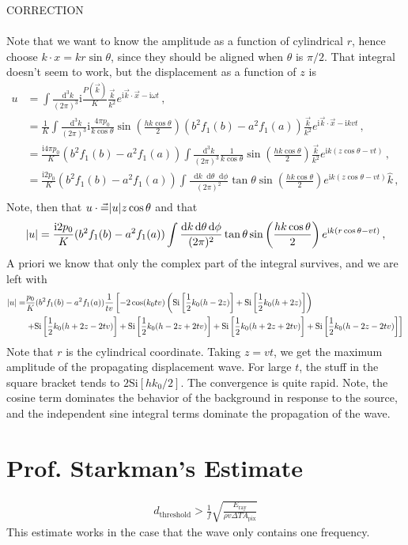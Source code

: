 \documentclass{article}
\newcommand*\diff{\mathop{}\!\mathrm{d}}
\newcommand*\te[1]{\text{#1}}
\newcommand*\p[1]{\left(#1\right)}
\newcommand*\ps[1]{\left[#1\right]}
\newcommand*\f[2]{\frac{#1}{#2}}
\newcommand*\I{\te{i}}
\begin{document}
CORRECTION
\\\\
Note that we want to know the amplitude as a function of cylindrical $r$, hence choose $k\cdot x = k r \sin\theta$, since they should be aligned when $\theta$ is $\pi/2$. That integral doesn't seem to work, but the displacement as a function of $z$ is
\begin{align}
u &= \int\f{\diff^3 k}{(2\pi)^3}\I\f{P(\vec k)}{K}\f{\vec k}{k^2}e^{\I \vec k\cdot\vec x - \I\omega t}\,,\\
&=\f{1}{K}\int\f{\diff^3 k}{(2\pi)^3}\I\f{4\pi p_0}{k\cos\theta}\sin\p{\f{h k\cos\theta}{2}}(b^2f_1(b)-a^2f_1(a))\f{\vec k}{k^2}e^{\I \vec k\cdot\vec x - \I k v t}\,,\\
&=\f{\I4\pi p_0}{K}(b^2f_1(b)-a^2f_1(a))\int\f{\diff^3 k}{(2\pi)^3}\f{1}{k\cos\theta}\sin\p{\f{h k\cos\theta}{2}}\f{\vec k}{k^2}e^{\I k(z\cos\theta -  v t)}\,,\\
&=\f{\I2 p_0}{K}(b^2f_1(b)-a^2f_1(a))\int\f{\diff k\diff\theta\diff\phi}{(2\pi)^2}\tan\theta\sin\p{\f{h k\cos\theta}{2}}e^{\I k(z\cos\theta -  v t)}\hat k\,,\\
\end{align}
Note, then that $u\cdot\vec  = \abs{u}z\cos\theta$ and that
\begin{align}
\abs{u}&=\f{\I2 p_0}{K}(b^2f_1(b)-a^2f_1(a))\int\f{\diff k\diff\theta\diff\phi}{(2\pi)^2}\tan\theta\sin\p{\f{h k\cos\theta}{2}}e^{\I k(r\cos\theta -  v t)}\,,\\
\end{align}
A priori we know that only the complex part of the integral survives, and we are left with
\begin{align}
\notag\abs{u} =& \f{ p_0}{K}(b^2f_1(b)-a^2f_1(a))\f{1}{tv}\ps{-2\cos(k_0 tv)\p{\te{Si}\ps{\f12 k_0(h - 2z)} + \te{Si}\ps{\f12 k_0(h + 2z)}}\right.\\&\left. + \te{Si} \ps{\f12 k_0(h+2z-2tv)}+ \te{Si}\ps{\f12 k_0(h-2z+2tv)}+\te{Si}\ps{\f12 k_0(h+2z+2tv)}+\te{Si}\ps{\f12 k_0(h-2z-2tv)}}
\end{align}
Note that $r$ is the cylindrical coordinate. Taking $z = vt$, we get the maximum amplitude of the propagating displacement wave. For large $t$, the stuff in the square bracket tends to $2\te{Si}\ps{h k_0/2}$. The convergence is quite rapid. Note, the cosine term dominates the behavior of the background in response to the source, and the independent sine integral terms dominate the propagation of the wave.
\pagebreak
\section{Prof. Starkman's Estimate}
\begin{align}
d_{\te{threshold}} > \frac{1}{f} \sqrt{ \frac{E_{\te{ray}}}{\rho v \Delta T A_{\te{pix}}}}
\end{align}
This estimate works in the case that the wave only contains one frequency. 
\pagebreak
\end{document}
